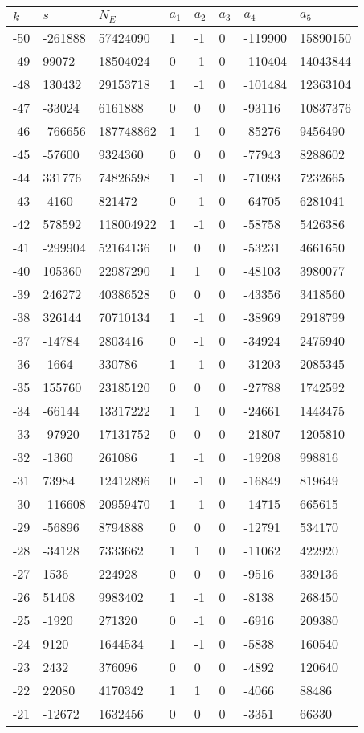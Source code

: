 \documentclass{amsart}
\begin{document}
\begin{longtable}{|l|l|l|lllll|}
\hline
$k$ & $s$ & $N_E$ & $a_1$ & $a_2$ & $a_3$ & $a_4$ & $a_5$\\
\hline
-50&-261888&57424090&1&-1&0&-119900&15890150\\
-49&99072&18504024&0&-1&0&-110404&14043844\\
-48&130432&29153718&1&-1&0&-101484&12363104\\
-47&-33024&6161888&0&0&0&-93116&10837376\\
-46&-766656&187748862&1&1&0&-85276&9456490\\
-45&-57600&9324360&0&0&0&-77943&8288602\\
-44&331776&74826598&1&-1&0&-71093&7232665\\
-43&-4160&821472&0&-1&0&-64705&6281041\\
-42&578592&118004922&1&-1&0&-58758&5426386\\
-41&-299904&52164136&0&0&0&-53231&4661650\\
-40&105360&22987290&1&1&0&-48103&3980077\\
-39&246272&40386528&0&0&0&-43356&3418560\\
-38&326144&70710134&1&-1&0&-38969&2918799\\
-37&-14784&2803416&0&-1&0&-34924&2475940\\
-36&-1664&330786&1&-1&0&-31203&2085345\\
-35&155760&23185120&0&0&0&-27788&1742592\\
-34&-66144&13317222&1&1&0&-24661&1443475\\
-33&-97920&17131752&0&0&0&-21807&1205810\\
-32&-1360&261086&1&-1&0&-19208&998816\\
-31&73984&12412896&0&-1&0&-16849&819649\\
-30&-116608&20959470&1&-1&0&-14715&665615\\
-29&-56896&8794888&0&0&0&-12791&534170\\
-28&-34128&7333662&1&1&0&-11062&422920\\
-27&1536&224928&0&0&0&-9516&339136\\
-26&51408&9983402&1&-1&0&-8138&268450\\
-25&-1920&271320&0&-1&0&-6916&209380\\
-24&9120&1644534&1&-1&0&-5838&160540\\
-23&2432&376096&0&0&0&-4892&120640\\
-22&22080&4170342&1&1&0&-4066&88486\\
-21&-12672&1632456&0&0&0&-3351&66330\\

\end{longtable}
\end{document}
